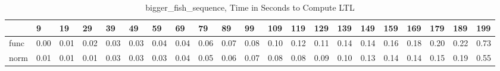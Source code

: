 \begin{table}
\centering
\caption{bigger_fish_sequence, Time in Seconds to Compute LTL}
\label{bigger_fish_sequence_LTL_time}
\begin{tabular}{lllllllllllllllllllll}
\toprule
{} &     9 &    19 &    29 &    39 &    49 &    59 &    69 &    79 &    89 &    99 &   109 &   119 &   129 &   139 &   149 &   159 &   169 &   179 &   189 &   199 \\
\midrule
func &  0.00 &  0.01 &  0.02 &  0.03 &  0.03 &  0.04 &  0.04 &  0.06 &  0.07 &  0.08 &  0.10 &  0.12 &  0.11 &  0.14 &  0.14 &  0.16 &  0.18 &  0.20 &  0.22 &  0.73 \\
norm &  0.01 &  0.01 &  0.01 &  0.03 &  0.03 &  0.03 &  0.04 &  0.05 &  0.06 &  0.07 &  0.08 &  0.08 &  0.09 &  0.10 &  0.13 &  0.14 &  0.14 &  0.15 &  0.19 &  0.55 \\
\bottomrule
\end{tabular}
\end{table}
